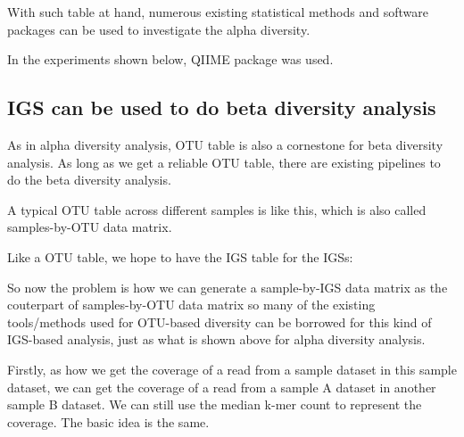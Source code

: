 With such table at hand, numerous existing statistical methods and software packages can be used to investigate the alpha diversity.  

In the experiments shown below, QIIME package was used. 




\subsection{IGS can be used to do beta diversity analysis}

As in alpha diversity analysis, OTU table is also a cornestone for beta diversity analysis. As long as we get a reliable OTU table, there are existing pipelines to do the beta diversity analysis. 

A typical OTU table across different samples is like this, which is also called samples-by-OTU data matrix.


    
Like a OTU table, we hope to have the IGS table for the IGSs:


    
    So now the problem is how we can generate a sample-by-IGS data matrix as the couterpart of samples-by-OTU data matrix so many of  the existing tools/methods used for OTU-based diversity can be borrowed for this kind of IGS-based analysis, just as what is shown above for alpha diversity analysis.

Firstly, as how we get the coverage of a read from a sample dataset in this sample dataset, we can get the coverage of a read from a sample A dataset in another sample B dataset. We can still use the median k-mer count to represent the coverage. The basic idea is the same. 


